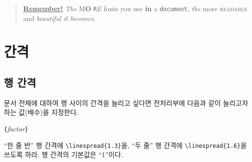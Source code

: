 
\begin{quote}
  \underline{\textbf{Remember\Huge!}} \textit{The}
  \textsf{M\textbf{\LARGE O} \texttt{R}\textsl{E}} fonts \Huge you
  \tiny use \footnotesize \textbf{in} a \small \texttt{document},
  \large \textit{the} \normalsize more \textsc{readable} and
  \textsl{\textsf{beautiful} it bec\large o\Large m\LARGE e\huge s}.
\end{quote}

\section{간격}

\subsection{행 간격}

문서 전체에 대하여 행 사이의 간격을%
늘리고 싶다면 전처리부에 다음과 같이
늘리고자 하는 값(배수)을 지정한다.
\begin{lscommand}
\verb|{|\emph{factor}\verb|}|
\end{lscommand}
\noindent ``한 줄 반'' 행 간격에 \verb|\linespread{1.3}|을,
``두 줄'' 행 간격에 \verb|\linespread{1.6}|\allowbreak 을 쓰도록 하라.
행 간격의 기본값은 ``1''이다.%

